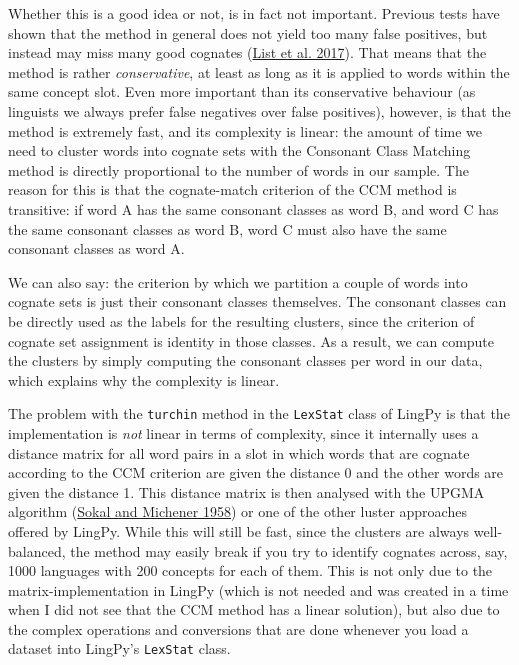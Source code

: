 \documentclass[
  a4paper,
  14pt,
  oneside,
  tablecaptionabove
]{scrbook}
\begin{document}
Whether this is a good idea or not, is in fact not important. Previous
tests have shown that the method in general does not yield too many
false positives, but instead may miss many good cognates (\href{http://bibliography.lingpy.org?key=List2017c}{List et al. 2017}).
That means that the method is rather \emph{conservative}, at least as
long as it is applied to words within the same concept slot. Even more
important than its conservative behaviour (as linguists we always prefer
false negatives over false positives), however, is that the method is
extremely fast, and its complexity is linear: the amount of time we need
to cluster words into cognate sets with the Consonant Class Matching
method is directly proportional to the number of words in our sample.
The reason for this is that the cognate-match criterion of the CCM
method is transitive: if word A has the same consonant classes as word
B, and word C has the same consonant classes as word B, word C must also
have the same consonant classes as word A.

We can also say: the criterion by which we partition a couple of words
into cognate sets is just their consonant classes themselves. The
consonant classes can be directly used as the labels for the resulting
clusters, since the criterion of cognate set assignment is identity in
those classes. As a result, we can compute the clusters by simply
computing the consonant classes per word in our data, which explains why
the complexity is linear.

The problem with the \lstinline!turchin! method in the
\lstinline!LexStat! class of LingPy is that the implementation is
\emph{not} linear in terms of complexity, since it internally uses a
distance matrix for all word pairs in a slot in which words that are
cognate according to the CCM criterion are given the distance 0 and the
other words are given the distance 1. This distance matrix is then
analysed with the UPGMA algorithm (\href{http://bibliography.lingpy.org?key=Sokal1958}{Sokal and Michener
1958}) or one of the other luster approaches offered by LingPy. While
this will still be fast, since the clusters are always well-balanced,
the method may easily break if you try to identify cognates across, say,
1000 languages with 200 concepts for each of them. This is not only due
to the matrix-implementation in LingPy (which is not needed and was
created in a time when I did not see that the CCM method has a linear
solution), but also due to the complex operations and conversions that
are done whenever you load a dataset into LingPy's \lstinline!LexStat!
class.
\end{document}
